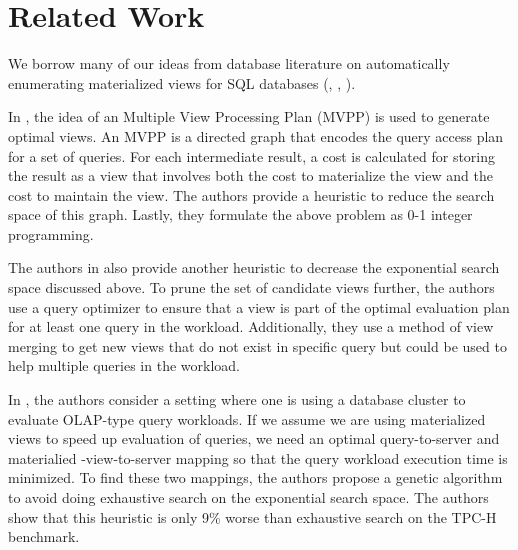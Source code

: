 \section{Related Work}
\label{sec:related}
We borrow many of our ideas from database literature on automatically enumerating materialized views for SQL databases (\cite{Yang:1997}, \cite{Agrawal:2000}, \cite{Phan:2008}).

In \cite{Yang:1997}, the idea of an Multiple View Processing Plan (MVPP) is used to generate optimal views. An MVPP is a directed graph that encodes the query access plan for a set of queries. For each intermediate result, a cost is calculated for storing the result as a view that involves both the cost to materialize the view and the cost to maintain the view. The authors provide a heuristic to reduce the search space of this graph. Lastly, they formulate the above problem as 0-1 integer programming.

The authors in \cite{Agrawal:2000} also provide another heuristic to decrease the exponential search space discussed above. To prune the set of candidate views further, the authors use a query optimizer to ensure that a view is part of the optimal evaluation plan for at least one query in the workload. Additionally, they use a method of view merging to get new views that do not exist in specific query but could be used to help multiple queries in the workload.

In \cite{Phan:2008}, the authors consider a setting where one is using a database cluster to evaluate OLAP-type query workloads. If we assume we are using materialized views to speed up evaluation of queries, we need an optimal query-to-server and materialied -view-to-server mapping so that the query workload execution time is minimized. To find these two mappings, the authors propose a genetic algorithm to avoid doing exhaustive search on the exponential search space. The authors show that this heuristic is only 9\% worse than exhaustive search on the TPC-H benchmark.